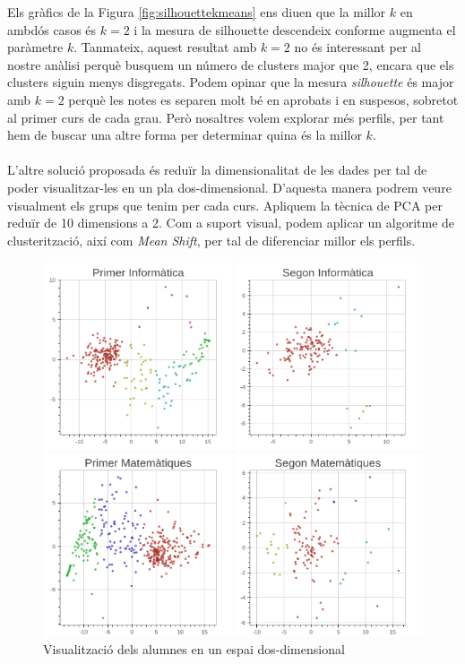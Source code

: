 \documentclass[12pt,a4paper,catalan]{article}
\begin{document}
Els gràfics de la Figura \ref{fig:silhouettekmeans} ens diuen que la millor $k$ en ambdós casos és $k=2$ i la mesura de silhouette descendeix conforme augmenta el paràmetre $k$. Tanmateix, aquest resultat amb $k=2$ no és interessant per al nostre anàlisi perquè busquem un número de clusters major que 2, encara que els clusters siguin menys disgregats. Podem opinar que la mesura \textit{silhouette} és major amb $k=2$ perquè les notes es separen molt bé en aprobats i en suspesos, sobretot al primer curs de cada grau. Però nosaltres volem explorar més perfils, per tant hem de buscar una altre forma per determinar quina és la millor $k$.
\\
\\
L'altre solució proposada és reduïr la dimensionalitat de les dades per tal de poder visualitzar-les en un pla dos-dimensional. D'aquesta manera podrem veure visualment els grups que tenim per cada curs. Apliquem la tècnica de PCA per reduïr de 10 dimensions a 2. Com a suport visual, podem aplicar un algoritme de clusterització, així com \textit{Mean Shift}, per tal de diferenciar millor els perfils. 

\begin{figure}[h]
\centering
\includegraphics[width=.9\linewidth]{img/pca_info_mates.png}
\caption{Visualització dels alumnes en un espai dos-dimensional}
\label{fig:pca-meanshift}
\end{figure}

\newpage
\end{document}
